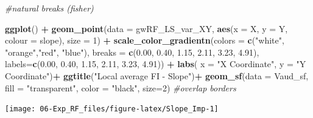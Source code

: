 \documentclass[
]{article}
\newenvironment{Shaded}{\begin{snugshade}}{\end{snugshade}}
\newcommand{\AttributeTok}[1]{\textcolor[rgb]{0.13,0.29,0.53}{#1}}
\newcommand{\CommentTok}[1]{\textcolor[rgb]{0.56,0.35,0.01}{\textit{#1}}}
\newcommand{\DecValTok}[1]{\textcolor[rgb]{0.00,0.00,0.81}{#1}}
\newcommand{\FloatTok}[1]{\textcolor[rgb]{0.00,0.00,0.81}{#1}}
\newcommand{\FunctionTok}[1]{\textcolor[rgb]{0.13,0.29,0.53}{\textbf{#1}}}
\newcommand{\NormalTok}[1]{#1}
\newcommand{\OtherTok}[1]{\textcolor[rgb]{0.56,0.35,0.01}{#1}}
\newcommand{\SpecialCharTok}[1]{\textcolor[rgb]{0.81,0.36,0.00}{\textbf{#1}}}
\newcommand{\StringTok}[1]{\textcolor[rgb]{0.31,0.60,0.02}{#1}}
\begin{document}
\begin{Shaded}
\begin{Highlighting}[]
\CommentTok{\#natural breaks (fisher)}

\FunctionTok{ggplot}\NormalTok{() }\SpecialCharTok{+}
    \FunctionTok{geom\_point}\NormalTok{(}\AttributeTok{data =}\NormalTok{ gwRF\_LS\_var\_XY, }\FunctionTok{aes}\NormalTok{(}\AttributeTok{x =}\NormalTok{ X, }\AttributeTok{y =}\NormalTok{ Y, }\AttributeTok{colour =}\NormalTok{ slope), }\AttributeTok{size =} \DecValTok{1}\NormalTok{) }\SpecialCharTok{+}
    \FunctionTok{scale\_color\_gradientn}\NormalTok{(}\AttributeTok{colors =} \FunctionTok{c}\NormalTok{(}\StringTok{"white"}\NormalTok{, }\StringTok{"orange"}\NormalTok{,}\StringTok{"red"}\NormalTok{, }\StringTok{"blue"}\NormalTok{),  }
                       \AttributeTok{breaks =} \FunctionTok{c}\NormalTok{(}\FloatTok{0.00}\NormalTok{, }\FloatTok{0.40}\NormalTok{, }\FloatTok{1.15}\NormalTok{, }\FloatTok{2.11}\NormalTok{, }\FloatTok{3.23}\NormalTok{, }\FloatTok{4.91}\NormalTok{), }
                       \AttributeTok{labels=}\FunctionTok{c}\NormalTok{(}\FloatTok{0.00}\NormalTok{, }\FloatTok{0.40}\NormalTok{, }\FloatTok{1.15}\NormalTok{, }\FloatTok{2.11}\NormalTok{, }\FloatTok{3.23}\NormalTok{, }\FloatTok{4.91}\NormalTok{)) }\SpecialCharTok{+}
        \FunctionTok{labs}\NormalTok{( }\AttributeTok{x =} \StringTok{"X Coordinate"}\NormalTok{, }\AttributeTok{y =} \StringTok{"Y Coordinate"}\NormalTok{)}\SpecialCharTok{+}
    \FunctionTok{ggtitle}\NormalTok{(}\StringTok{"Local average FI {-} Slope"}\NormalTok{)}\SpecialCharTok{+}
    \FunctionTok{geom\_sf}\NormalTok{(}\AttributeTok{data =}\NormalTok{ Vaud\_sf, }\AttributeTok{fill =} \StringTok{"transparent"}\NormalTok{, }\AttributeTok{color =} \StringTok{"black"}\NormalTok{, }\AttributeTok{size=}\DecValTok{2}\NormalTok{) }\CommentTok{\#overlap borders}
\end{Highlighting}
\end{Shaded}

\begin{center}\texttt{[image: 06-Exp\_RF\_files/figure-latex/Slope\_Imp-1]} \end{center}

\begin{Shaded}
\end{Shaded}
\end{document}
